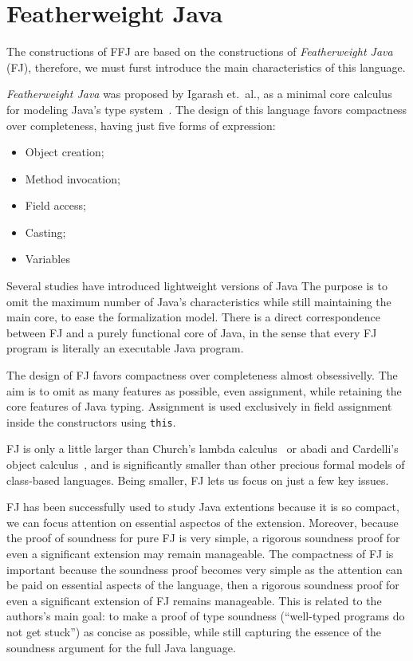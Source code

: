 \section{Featherweight Java}

The constructions of FFJ are based on the constructions of \textit{Featherweight
Java} (FJ), therefore, we must furst introduce the main characteristics of
this language.

\textit{Featherweight Java} was proposed by Igarash et.\ al., as a minimal core
calculus for modeling Java's type system~\cite{Igarashi99featherweightjava}. The 
design of this language favors compactness over completeness, having just five 
forms of expression:
\begin{itemize}
    \item Object creation;
    \item Method invocation;
    \item Field access;
    \item Casting;
    \item Variables
\end{itemize}

Several studies have introduced lightweight versions of Java
The purpose is to omit the maximum number of Java's characteristics while
still maintaining the main core, to ease the formalization model. There is a
direct correspondence between FJ and a purely functional core of Java, in the
sense that every FJ program is literally an executable Java program.

The design of FJ favors compactness over completeness almost obsessivelly.  The
aim is to omit as many features as possible, even assignment, while retaining
the core features of Java typing.  Assignment is used exclusively in field
assignment inside the  constructors using \texttt{this}. 

FJ is only a little larger than Church's lambda calculus~\cite{barendregt1984}
or abadi and Cardelli's object calculus~\cite{abadi1996}, and is significantly
smaller than other precious formal models of class-based languages. 
Being smaller, FJ lets us focus on just a few key issues.

FJ has been successfully used to study Java extentions because it is so
compact, we can focus attention on essential aspectos of the extension.
Moreover, because the proof of soundness for pure FJ is very simple, a rigorous
soundness proof for even a significant extension may remain manageable.  The
compactness of FJ is important because the soundness proof becomes very simple
as the attention can be paid on essential aspects of the language, then a
rigorous soundness proof for even a significant extension of FJ remains
manageable. This is related to the authors's main goal: to make a proof of type
soundness (``well-typed programs do not get stuck'') as concise as possible,
while still capturing the essence of the soundness argument for the full Java
language.


